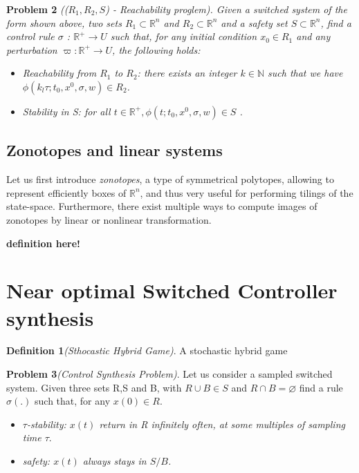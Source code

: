  
 \textbf{Problem 2} \emph{((${R_1,R_2,S}$) - Reachability proglem).
  Given a switched system of the form shown above, two sets  
  ${ R_1 \subset \mathbb{R}^n}$  and ${ R_2 \subset \mathbb{R}^n}$ 
 and a safety set  ${S \subset  \mathbb{R}^n}$, find a control rule 
 ${\sigma}$ :
  ${\mathbb{R}^+\rightarrow U}$ such that, for any initial condition 
  ${x_0  \in  R_1}$ and any perturbation  ${\varpi : \mathbb{R}^+  
  \rightarrow U}$, the following holds:}
 
 \begin{itemize}
    \item  \emph{Reachability from ${R_1}$ to ${R_2}$: there exists 
    an integer ${k \in \mathbb{N} }$ such that we have ${ \phi( k_l\tau
    ;t_0,x^0,\sigma,w) \in R_2 }$.}    
    \item \emph{ Stability in S: for all ${ t \in \mathbb{R}^+, 
    \phi(t;t_0,x^0,\sigma,w) \in S}$ .}
\end{itemize}
 

\subsection{Zonotopes and linear systems}
  Let us first introduce \emph{zonotopes}, a type of symmetrical 
  polytopes, allowing to represent efficiently boxes of ${\mathbb{R}^n}$, 
  and thus very useful for performing tilings of the state-space. 
  Furthermore, there exist multiple ways to compute images of zonotopes
  by linear or nonlinear transformation.

  \textbf{ definition here! }

\section{Near optimal Switched Controller synthesis}

\textbf{Definition 1}\emph{(Sthocastic Hybrid Game)}. A stochastic
 hybrid game 
 
\textbf{Problem 3}\emph{(Control Synthesis Problem)}. Let us 
consider a sampled switched system. Given three sets R,S and B, 
with ${R \cup B \in S}$  and ${R \cap B = \varnothing }$ find a 
rule ${\sigma(.)}$ such that, for any ${x(0) \in R }$. 

\begin{itemize}
    \item \emph{ ${\tau}$-stability: ${x(t)}$ return in R 
    infinitely often, at some multiples of sampling time ${\tau}$}.
    \item \emph{ safety: ${x(t)}$ always stays in ${S/B}$.}
\end{itemize}

